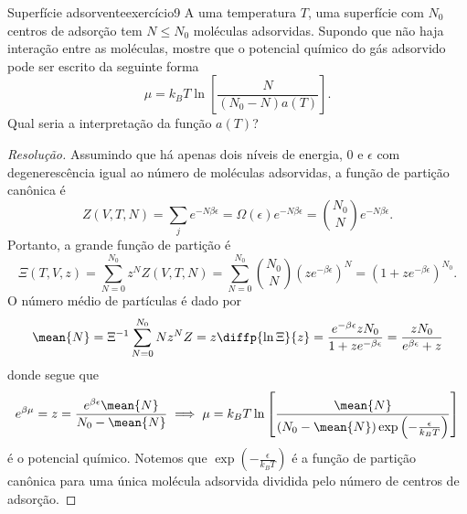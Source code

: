 \begin{exercício}{Superfície adsorvente}{exercício9}
    A uma temperatura \(T\), uma superfície com \(N_0\) centros de adsorção tem \(N \leq N_0\) moléculas adsorvidas. Supondo que não haja interação entre as moléculas, mostre que o potencial químico do gás adsorvido pode ser escrito da seguinte forma
    \begin{equation*}
        \mu = k_BT \ln\left[\frac{N}{(N_0 - N) a(T)}\right].
    \end{equation*}
    Qual seria a interpretação da função \(a(T)\)?
\end{exercício}
\begin{proof}[Resolução]
    Assumindo que há apenas dois níveis de energia, 0 e \(\epsilon\) com degenerescência igual ao número de moléculas adsorvidas, a função de partição canônica é
    \begin{equation*}
        Z(V, T, N) = \sum_{j} e^{-N \beta \epsilon} = \Omega(\epsilon) e^{-N \beta \epsilon} = \binom{N_0}{N} e^{-N \beta \epsilon}.
    \end{equation*}
    Portanto, a grande função de partição é
    \begin{equation*}
        \Xi(T, V, z) = \sum_{N=0}^{N_0} z^N Z(V, T, N) = \sum_{N = 0}^{N_0} \binom{N_0}{N} \left(z e^{-\beta \epsilon}\right)^{N} = \left(1 + ze^{-\beta \epsilon}\right)^{N_0}.
    \end{equation*}
    O número médio de partículas é dado por
    \begin{equation*}
        \mean{N} = \Xi^{-1}\sum_{N=0}^{N_0} Nz^N Z = z\diffp{\ln \Xi}{z} = \frac{e^{-\beta \epsilon}z N_0}{1 + z e^{-\beta \epsilon}} = \frac{z N_0}{e^{\beta \epsilon} + z}
    \end{equation*}
    donde segue que
    \begin{equation*}
        e^{\beta \mu} = z = \frac{e^{\beta \epsilon}\mean{N}}{N_0 - \mean{N}} \implies \mu = k_BT \ln\left[\frac{\mean{N}}{\left(N_0 - \mean{N}\right)\exp\left(-\frac{\epsilon}{k_B T}\right)}\right]
    \end{equation*}
    é o potencial químico. Notemos que \(\exp\left(-\frac{\epsilon}{k_BT}\right)\) é a função de partição canônica para uma única molécula adsorvida dividida pelo número de centros de adsorção.
\end{proof}
